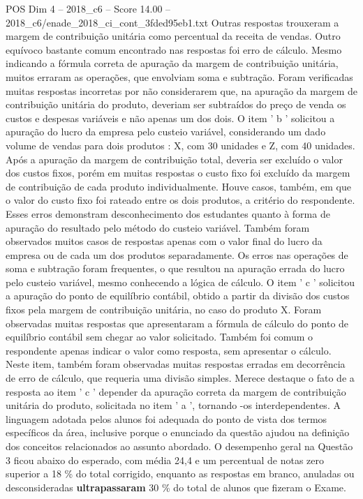 \begin{textsample}{POS Dim 4 – 2018\_c6 – Score 14.00 – 2018\_c6/enade\_2018\_ci\_cont\_3fded95eb1.txt}
Outras respostas trouxeram a margem de contribuição unitária como percentual da receita de vendas.
Outro equívoco bastante comum encontrado nas respostas foi erro de cálculo.
Mesmo indicando a fórmula correta de apuração da margem de contribuição unitária, muitos erraram as operações, que envolviam soma e subtração.
Foram verificadas muitas respostas incorretas por não considerarem que, na apuração da margem de contribuição unitária do produto, deveriam ser subtraídos do preço de venda os custos e despesas variáveis e não apenas um dos dois.
O item ' b ' solicitou a apuração do lucro da empresa pelo custeio variável, considerando um dado volume de vendas para dois produtos : X, com 30 unidades e Z, com 40 unidades.
Após a apuração da margem de contribuição total, deveria ser excluído o valor dos custos fixos, porém em muitas respostas o custo fixo foi excluído da margem de contribuição de cada produto individualmente.
Houve casos, também, em que o valor do custo fixo foi rateado entre os dois produtos, a critério do respondente.
Esses erros demonstram desconhecimento dos estudantes quanto à forma de apuração do resultado pelo método do custeio variável.
Também foram observados muitos casos de respostas apenas com o valor final do lucro da empresa ou de cada um dos produtos separadamente.
Os erros nas operações de soma e subtração foram frequentes, o que resultou na apuração errada do lucro pelo custeio variável, mesmo conhecendo a lógica de cálculo.
O item ' c ' solicitou a apuração do ponto de equilíbrio contábil, obtido a partir da divisão dos custos fixos pela margem de contribuição unitária, no caso do produto X.
Foram observadas muitas respostas que apresentaram a fórmula de cálculo do ponto de equilíbrio contábil sem chegar ao valor solicitado.
Também foi comum o respondente apenas indicar o valor como resposta, sem apresentar o cálculo.
Neste item, também foram observadas muitas respostas erradas em decorrência de erro de cálculo, que requeria uma divisão simples.
Merece destaque o fato de a resposta ao item ’ c ’ depender da apuração correta da margem de contribuição unitária do produto, solicitada no item ' a ', tornando -os interdependentes.
A linguagem adotada pelos alunos foi adequada do ponto de vista dos termos específicos da área, inclusive porque o enunciado da questão ajudou na definição dos conceitos relacionados ao assunto abordado.
O desempenho geral na Questão 3 ficou abaixo do esperado, com média 24,4 e um percentual de notas zero superior a 18 \% do total corrigido, enquanto as respostas em branco, anuladas ou desconsideradas \textbf{ultrapassaram} 30 \% do total de alunos que fizeram o Exame.

\end{textsample}
